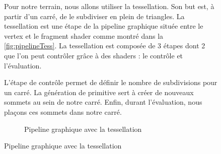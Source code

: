 \begin{figure}[H]
	\begin{minipage}[t!]{0.50\textwidth} %
		Pour notre terrain, nous allons utiliser la tessellation. Son but est, à partir d'un carré, de le subdiviser en plein de triangles. La tessellation est une étape de la pipeline graphique située entre le vertex et le fragment shader comme montré dans la \autoref{fig:pipelineTess}. La tessellation est composée de 3 étapes dont 2 que l'on peut contrôler grâce à des shaders : le contrôle et l'évaluation.
		
		L'étape de contrôle permet de définir le nombre de subdivisions pour un carré. La génération de primitive sert à créer de nouveaux sommets au sein de notre carré. Enfin, durant l'évaluation, nous plaçons ces sommets dans notre carré. 
	\end{minipage}
	\hfill %
	\begin{minipage}[t!]{0.45\textwidth} %
		\begin{figure}[H]			
			\caption{Pipeline graphique avec la tessellation}
			\label{fig:pipelineTess}
		\end{figure}
	\end{minipage}
\end{figure}




